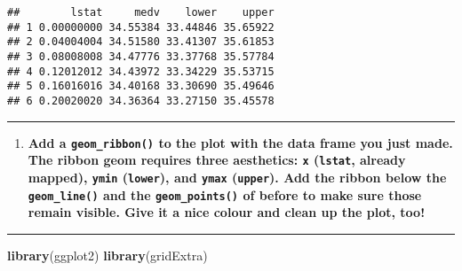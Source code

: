 \documentclass[
  12pt,
]{article}
\newenvironment{Shaded}{\begin{snugshade}}{\end{snugshade}}
\newcommand{\AttributeTok}[1]{\textcolor[rgb]{0.13,0.29,0.53}{#1}}
\newcommand{\CommentTok}[1]{\textcolor[rgb]{0.56,0.35,0.01}{\textit{#1}}}
\newcommand{\FunctionTok}[1]{\textcolor[rgb]{0.13,0.29,0.53}{\textbf{#1}}}
\newcommand{\NormalTok}[1]{#1}
\newcommand{\OtherTok}[1]{\textcolor[rgb]{0.56,0.35,0.01}{#1}}
\newcommand{\SpecialCharTok}[1]{\textcolor[rgb]{0.81,0.36,0.00}{\textbf{#1}}}
\newcommand{\StringTok}[1]{\textcolor[rgb]{0.31,0.60,0.02}{#1}}
\providecommand{\tightlist}{%
  \setlength{\itemsep}{0pt}\setlength{\parskip}{0pt}}
\begin{document}
\begin{Shaded}
\end{Shaded}

\begin{verbatim}
##        lstat     medv    lower    upper
## 1 0.00000000 34.55384 33.44846 35.65922
## 2 0.04004004 34.51580 33.41307 35.61853
## 3 0.08008008 34.47776 33.37768 35.57784
## 4 0.12012012 34.43972 33.34229 35.53715
## 5 0.16016016 34.40168 33.30690 35.49646
## 6 0.20020020 34.36364 33.27150 35.45578
\end{verbatim}

\begin{center}\rule{0.5\linewidth}{0.5pt}\end{center}

\begin{enumerate}
\def\labelenumi{\arabic{enumi}.}
\setcounter{enumi}{6}
\tightlist
\item
  \textbf{Add a \texttt{geom\_ribbon()} to the plot with the data frame
  you just made. The ribbon geom requires three aesthetics: \texttt{x}
  (\texttt{lstat}, already mapped), \texttt{ymin} (\texttt{lower}), and
  \texttt{ymax} (\texttt{upper}). Add the ribbon below the
  \texttt{geom\_line()} and the \texttt{geom\_points()} of before to
  make sure those remain visible. Give it a nice colour and clean up the
  plot, too!}
\end{enumerate}

\begin{center}\rule{0.5\linewidth}{0.5pt}\end{center}

\begin{Shaded}
\begin{Highlighting}[]
\FunctionTok{library}\NormalTok{(ggplot2)}
\FunctionTok{library}\NormalTok{(gridExtra)}
\end{Highlighting}
\end{Shaded}
\end{document}
